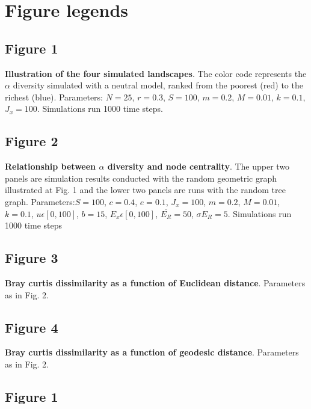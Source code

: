\documentclass[12pt]{article}
\begin{document}
\printbibliography

\newpage
\section*{Figure legends}

\subsection*{Figure 1}
\textbf{Illustration of the four simulated landscapes}. The color code
represents the $\alpha$ diversity simulated with a neutral model, ranked from
the poorest (red) to the richest (blue). Parameters: $N = 25$, $r = 0.3 $, $S =
100$, $m = 0.2$, $M = 0.01$, $k = 0.1$, $J_x = 100$. Simulations run 1000 time
steps.

\subsection*{Figure 2}
\textbf{Relationship between $\alpha$ diversity and node centrality}. The upper
two panels are simulation results conducted with the random geometric graph
illustrated at Fig. 1 and the lower two panels are runs with the random tree
graph. Parameters:$S = 100$, $c = 0.4$, $e = 0.1$, $J_x = 100$, $m = 0.2$, $M =
0.01$, $k = 0.1$, $ u \epsilon [0,100]$, $b = 15$, $ E_x \epsilon [0,100]$,
$\overline{E_R} = 50$, $\sigma{E_R} = 5$. Simulations run 1000 time steps

\subsection*{Figure 3}
\textbf{Bray curtis dissimilarity as a function of Euclidean distance}. Parameters as in Fig. 2.

\subsection*{Figure 4}
\textbf{Bray curtis dissimilarity as a function of geodesic distance}. Parameters as in Fig. 2.

\newpage
\subsection*{Figure 1}
\end{document}
